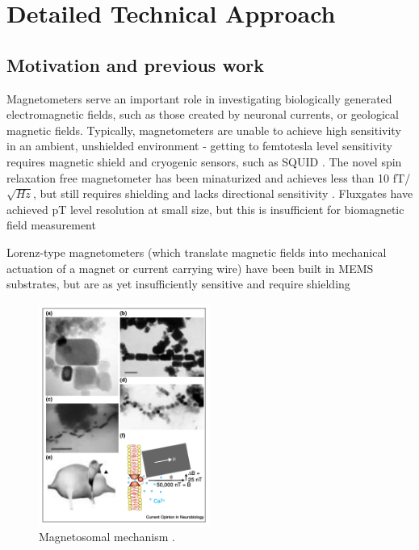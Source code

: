 \section{Detailed Technical Approach}

\subsection{Motivation and previous work}

Magnetometers serve an important role in investigating biologically generated electromagnetic fields, such as those created by neuronal currents, or geological magnetic fields. Typically, magnetometers are unable to achieve high sensitivity in an ambient, unshielded environment - getting to femtotesla level sensitivity requires magnetic shield and cryogenic sensors, such as SQUID \cite{lenz2006magnetic}. The novel spin relaxation free magnetometer has been minaturized and achieves less than 10 fT/$\sqrt{Hz}$, but still requires shielding and lacks directional sensitivity \cite{shah2013compact}. Fluxgates have achieved pT level resolution at small size, but this is insufficient for biomagnetic field measurement \cite{sasada2002orthogonal,uchiyama2014highly,sasada2014fundamental} 

Lorenz-type magnetometers (which translate magnetic fields into mechanical actuation of a magnet or current carrying wire) have been built in MEMS substrates, but are as yet insufficiently sensitive and require shielding \cite{sinha201627,kyynarainen20083d,kumar2015ultra,thompson2009parametrically}

\begin{figure}
\centering
\includegraphics[width=0.5\textwidth]{kirsh2001}
\caption{Magnetosomal mechanism \cite{kirschvink2001magnetite}.}
\label{fig:magnetosome}
\end{figure}

